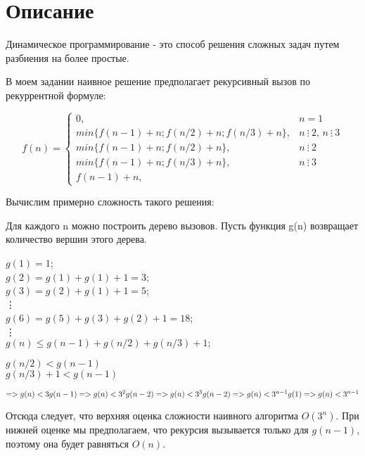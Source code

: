 \section{Описание}

Динамическое программирование - это способ решения сложных задач путем разбиения на более простые.

В моем задании наивное решение предполагает рекурсивный вызов по рекуррентной формуле: 

\begin{equation*}
  f(n) = 
  \begin{cases}
      0, &\text{$n = 1$} \\
      min\{f(n-1) + n; f(n/2) + n; f(n/3) + n\}, &\text{$n\ \vdots\ 2$, $n\ \vdots\ 3$} \\
      min\{f(n-1) + n; f(n/2) + n\}, &\text{$n\ \vdots\ 2$} \\
      min\{f(n-1) + n; f(n/3) + n\}, &\text{$n\ \vdots\ 3$} \\
      f(n-1) + n, &\text{}
  \end{cases}
\end{equation*}

Вычислим примерно сложность такого решения: 

Для каждого n можно построить дерево вызовов. Пусть функция g(n) возвращает количество вершин этого дерева. 

$g(1) = 1$; \\
$g(2) = g(1) + g(1) + 1 = 3$; \\
$g(3) = g(2) + g(1) + 1 = 5$; \\
\vdots \\
$g(6) = g(5) + g(3) + g(2) + 1 = 18$; \\
\vdots \\
$g(n) \leq g(n - 1) + g(n / 2) + g(n / 3) + 1;$ \\


\begin{center}
  $g(n / 2) < g(n - 1)$ \\
  $g(n / 3) + 1 < g(n - 1)$
\end{center}
$=> g(n) < 3g(n - 1) \\
=> g(n) < 3^{2}g(n-2) \\
=> g(n) < 3^{3}g(n-2) \\
=> g(n) < 3^{n-1}g(1) \\
=> g(n) < 3^{n-1}$

Отсюда следует, что верхняя оценка сложности наивного алгоритма $O(3^n)$. При нижней оценке мы предполагаем, что рекурсия вызывается только для $g(n-1)$, поэтому она будет равняться $O(n)$.

